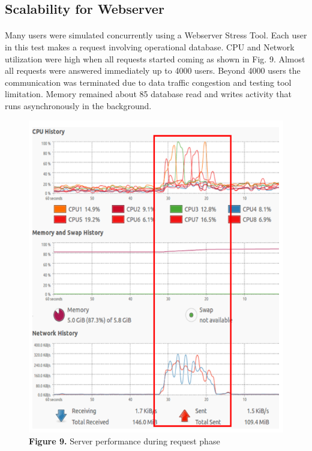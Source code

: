 \documentclass[a4paper,12pt,oneside]{article}
\let\counterwithin\relax
\begin{document}
\newpage
\subsection{Scalability for Webserver}
\paragraph{}
Many users were simulated concurrently using a Webserver
Stress Tool. Each user in this test makes a request involving
operational database. CPU and Network utilization were high
when all requests started coming as shown in Fig. 9. Almost
all requests were answered immediately up to 4000 users.
Beyond 4000 users the communication was terminated due to
data traffic congestion and testing tool limitation. Memory
remained about 85%
database read and writes activity that runs asynchronously in
the background.
    \begin{figure}[H]
    \includegraphics{Figure9.png}
    \centering
    \caption[Server performance during request phase]{\textbf{Figure 9.} Server performance during request phase}
    \end{figure}
\end{document}
